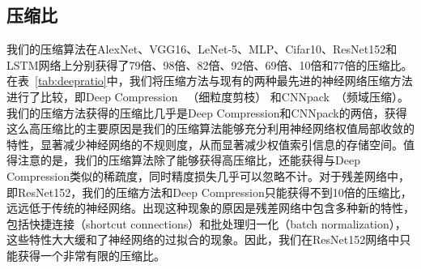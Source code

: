 \subsection{压缩比}
我们的压缩算法在AlexNet、VGG16、LeNet-5、MLP、Cifar10、ResNet152和LSTM网络上分别获得了79倍、98倍、82倍、92倍、69倍、10倍和77倍的压缩比。在表~\ref{tab:deepratio}中，我们将压缩方法与现有的两种最先进的神经网络压缩方法进行了比较，即Deep Compression~\cite{han2015deep} （细粒度剪枝） 和CNNpack~\cite{wang2016cnnpack}（频域压缩）。我们的压缩方法获得的压缩比几乎是Deep Compression和CNNpack的两倍，获得这么高压缩比的主要原因是我们的压缩算法能够充分利用神经网络权值局部收敛的特性，显著减少神经网络的不规则度，从而显著减少权值索引信息的存储空间。值得注意的是，我们的压缩算法除了能够获得高压缩比，还能获得与Deep Compression类似的稀疏度，同时精度损失几乎可以忽略不计。对于残差网络中，即ResNet152，我们的压缩方法和Deep Compression只能获得不到10倍的压缩比，远远低于传统的神经网络。出现这种现象的原因是残差网络中包含多种新的特性，包括快捷连接（shortcut connections）和批处理归一化（batch normalization），这些特性大大缓和了神经网络的过拟合的现象。因此，我们在ResNet152网络中只能获得一个非常有限的压缩比。

